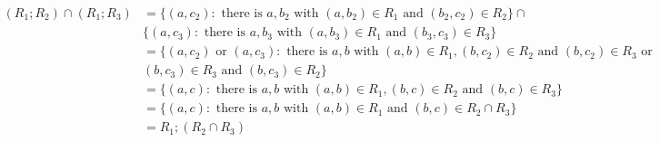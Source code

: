 \documentclass{article} %
\begin{document}
\[\begin{array}{rlcr}

(R_{1};R_{2})\cap(R_{1};R_{3})	&=\{(a,c_{2}):\mbox{ there is }a,b_{2}\mbox{ with }(a,b_{2})\in R_{1}\mbox{ and }(b_{2},c_{2})\in R_{2}\}\cap\\
								&\{(a,c_{3}):\mbox{ there is }a,b_{3}\mbox{ with }(a,b_{3})\in R_{1}\mbox{ and }(b_{3},c_{3})\in R_{3}\}\\
								&=\{(a,c_{2})\mbox{ or }(a,c_{3}):\mbox{ there is }a,b \mbox{ with }(a,b)\in R_{1},(b,c_2)\in R_{2}\mbox{ and } (b,c_2)\in R_{3}\mbox{ or }\\
								&(b,c_{3})\in R_{3} \mbox{ and }(b,c_{3})\in R_{2}\}\\
								&=\{(a,c):\mbox{ there is }a,b\mbox{ with }(a,b)\in R_{1},(b,c)\in R_{2}\mbox{ and }(b,c)\in R_{3}\}\\
								&=\{(a,c):\mbox{ there is }a,b\mbox{ with }(a,b)\in R_{1}\mbox{ and }(b,c)\in R_{2}\cap R_{3}\}\\
								&=R_{1};(R_{2}\cap R_{3})\\
\end{array}\]
\end{document}
